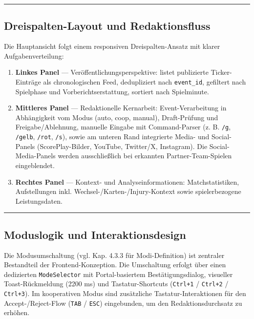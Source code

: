 \begin{center}\rule{0.5\linewidth}{0.5pt}\end{center}

\subsection{Dreispalten-Layout und
Redaktionsfluss}\label{dreispalten-layout-und-redaktionsfluss}

Die Hauptansicht folgt einem responsiven Dreispalten-Ansatz mit klarer
Aufgabenverteilung:

\begin{enumerate}
\def\labelenumi{\arabic{enumi}.}
\tightlist
\item
  \textbf{Linkes Panel} --- Veröffentlichungsperspektive: listet
  publizierte Ticker-Einträge als chronologischen Feed, dedupliziert
  nach \texttt{event\_id}, gefiltert nach Spielphase und
  Vorberichtserstattung, sortiert nach Spielminute.
\item
  \textbf{Mittleres Panel} --- Redaktionelle Kernarbeit:
  Event-Verarbeitung in Abhängigkeit vom Modus (auto, coop, manual),
  Draft-Prüfung und Freigabe/Ablehnung, manuelle Eingabe mit
  Command-Parser (z. B. \texttt{/g}, \texttt{/gelb}, \texttt{/rot},
  \texttt{/s}), sowie am unteren Rand integrierte Media- und
  Social-Panels (ScorePlay-Bilder, YouTube, Twitter/X, Instagram). Die
  Social-Media-Panels werden ausschließlich bei erkannten
  Partner-Team-Spielen eingeblendet.
\item
  \textbf{Rechtes Panel} --- Kontext- und Analyseinformationen:
  Matchstatistiken, Aufstellungen inkl. Wechsel-/Karten-/Injury-Kontext
  sowie spielerbezogene Leistungsdaten.
\end{enumerate}

\begin{center}\rule{0.5\linewidth}{0.5pt}\end{center}

\subsection{Moduslogik und
Interaktionsdesign}\label{moduslogik-und-interaktionsdesign}

Die Modusumschaltung (vgl. Kap. 4.3.3 für Modi-Definition) ist zentraler
Bestandteil der Frontend-Konzeption. Die Umschaltung erfolgt über einen
dedizierten \texttt{ModeSelector} mit Portal-basiertem
Bestätigungsdialog, visueller Toast-Rückmeldung (2200 ms) und
Tastatur-Shortcuts (\texttt{Ctrl+1} / \texttt{Ctrl+2} /
\texttt{Ctrl+3}). Im kooperativen Modus sind zusätzliche
Tastatur-Interaktionen für den Accept-/Reject-Flow (\texttt{TAB} /
\texttt{ESC}) eingebunden, um den Redaktionsdurchsatz zu erhöhen.

